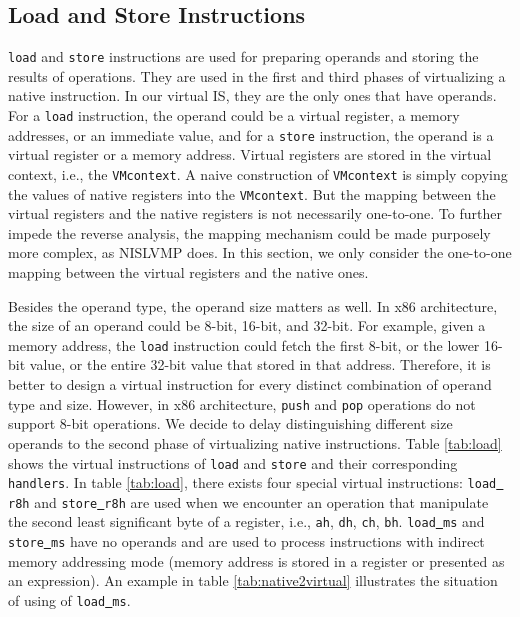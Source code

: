 \subsection{Load and Store Instructions}
\texttt{load} and \texttt{store} instructions are used for preparing operands and storing the results of operations. They are used in the first and third phases of virtualizing a native instruction. In our virtual IS, they are the only ones that have operands. For a \texttt{load} instruction, the operand could be a virtual register, a memory addresses, or an immediate value, and for a \texttt{store} instruction, the operand is a virtual register or a memory address. Virtual registers are stored in the virtual context, i.e., the \texttt{VMcontext}. A naive construction of \texttt{VMcontext} is simply copying the values of native registers into the \texttt{VMcontext}. But the mapping between the virtual registers and the native registers is not necessarily one-to-one. To further impede the reverse analysis, the mapping mechanism could be made purposely more complex, as NISLVMP \cite{wang2013nislvmp} does. In this section, we only consider the one-to-one mapping between the virtual registers and the native ones.



Besides the operand type, the operand size matters as well. In x86 architecture, the size of an operand could be 8-bit, 16-bit, and 32-bit. For example, given a memory address, the \texttt{load} instruction could fetch the first 8-bit, or the lower 16-bit value, or the entire 32-bit value that stored in that address. Therefore, it is better to design a virtual instruction for every distinct combination of operand type and size. However, in x86 architecture, \texttt{push} and \texttt{pop} operations do not support 8-bit operations. We decide to delay distinguishing different size operands to the second phase of virtualizing native instructions. Table \ref{tab:load} shows the virtual instructions of \texttt{load} and \texttt{store} and their corresponding \texttt{handlers}. In table \ref{tab:load}, there exists four special virtual instructions: \texttt{load\underline{ }r8h} and \texttt{store\underline{ }r8h} are used when we encounter an operation that manipulate the second least significant byte of a register, i.e., \texttt{ah}, \texttt{dh}, \texttt{ch}, \texttt{bh}. \texttt{load\underline{ }ms} and \texttt{store\underline{ }ms} have no operands and are used to process instructions with indirect memory addressing mode (memory address is stored in a register or presented as an expression). An example in table \ref{tab:native2virtual} illustrates the situation of using of \texttt{load\underline{ }ms}.

